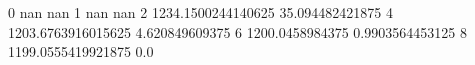 0 nan nan
1 nan nan
2 1234.1500244140625 35.094482421875
4 1203.6763916015625 4.620849609375
6 1200.0458984375 0.9903564453125
8 1199.0555419921875 0.0
